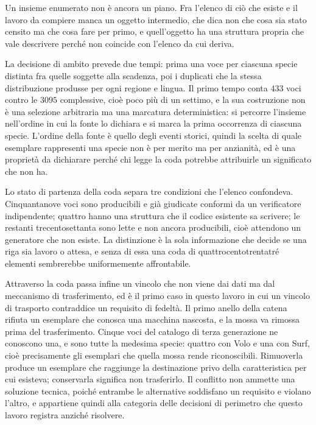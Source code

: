 Un insieme enumerato non è ancora un piano. Fra l'elenco di ciò che esiste e il lavoro da compiere manca un oggetto intermedio, che dica non che cosa sia stato censito ma che cosa fare per primo, e quell'oggetto ha una struttura propria che vale descrivere perché non coincide con l'elenco da cui deriva.

La decisione di ambito prevede due tempi: prima una voce per ciascuna specie distinta fra quelle soggette alla scadenza, poi i duplicati che la stessa distribuzione produsse per ogni regione e lingua. Il primo tempo conta $433$ voci contro le $3095$ complessive, cioè poco più di un settimo, e la sua costruzione non è una selezione arbitraria ma una marcatura deterministica: si percorre l'insieme nell'ordine in cui la fonte lo dichiara e si marca la prima occorrenza di ciascuna specie. L'ordine della fonte è quello degli eventi storici, quindi la scelta di quale esemplare rappresenti una specie non è per merito ma per anzianità, ed è una proprietà da dichiarare perché chi legge la coda potrebbe attribuirle un significato che non ha.

Lo stato di partenza della coda separa tre condizioni che l'elenco confondeva. Cinquantanove voci sono producibili e già giudicate conformi da un verificatore indipendente; quattro hanno una struttura che il codice esistente sa scrivere; le restanti trecentosettanta sono lette e non ancora producibili, cioè attendono un generatore che non esiste. La distinzione è la sola informazione che decide se una riga sia lavoro o attesa, e senza di essa una coda di quattrocentotrentatré elementi sembrerebbe uniformemente affrontabile.

Attraverso la coda passa infine un vincolo che non viene dai dati ma dal meccanismo di trasferimento, ed è il primo caso in questo lavoro in cui un vincolo di trasporto contraddice un requisito di fedeltà. Il primo anello della catena rifiuta un esemplare che conosca una macchina nascosta, e la mossa va rimossa prima del trasferimento. Cinque voci del catalogo di terza generazione ne conoscono una, e sono tutte la medesima specie: quattro con Volo e una con Surf, cioè precisamente gli esemplari che quella mossa rende riconoscibili. Rimuoverla produce un esemplare che raggiunge la destinazione privo della caratteristica per cui esisteva; conservarla significa non trasferirlo. Il conflitto non ammette una soluzione tecnica, poiché entrambe le alternative soddisfano un requisito e violano l'altro, e appartiene quindi alla categoria delle decisioni di perimetro che questo lavoro registra anziché risolvere.

